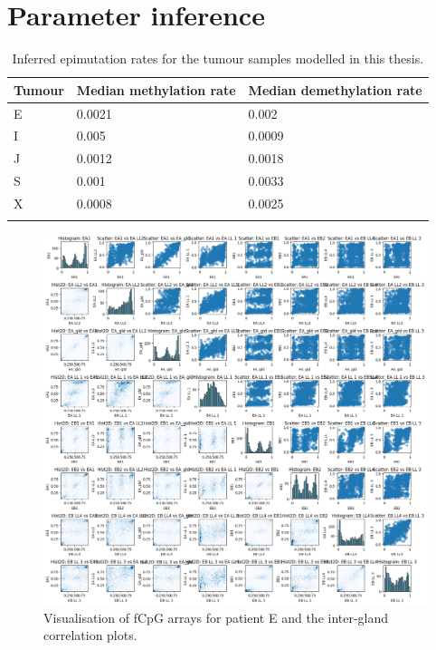 \chapter{Parameter inference}\label{app:inference}

\begin{table}[h]
\centering
    \begin{tabularx}{0.85\textwidth}{|X|X|X|}
\hline
    Tumour & Median methylation rate & Median demethylation rate \\
\hline
    E & 0.0021 & 0.002  \\
    I & 0.005  & 0.0009 \\
    J & 0.0012 & 0.0018 \\
    S & 0.001  & 0.0033 \\
    X & 0.0008 & 0.0025 \\
\hline
\label{tab:inferred_epimutation_rates}
\end{tabularx}
\caption{Inferred epimutation rates for the tumour samples modelled in this
    thesis.}
\end{table}

\begin{figure}[ht]
\centering
\includegraphics[width=\textwidth]{Chapter_5/figures/fCpG_loci_E.png}
\caption{Visualisation of fCpG arrays for patient E and the inter-gland
    correlation plots.}
\label{fig:vis_E}
\end{figure}

